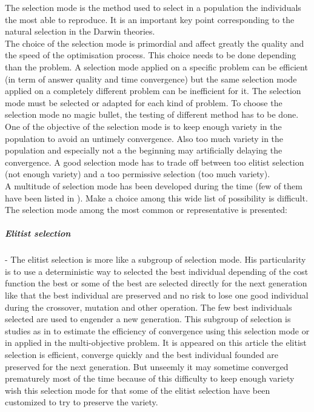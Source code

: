  The selection mode is  the method  used to select in a population the individuals the most able to reproduce. It is an important key point corresponding to the natural selection in the Darwin theories. \\
The choice of the selection mode is primordial and affect greatly the quality and the speed of the optimisation process. This choice needs to be done depending than the problem. A selection mode applied on a specific problem  can be efficient (in term of answer quality and time convergence)  but  the same  selection mode applied on  a completely different problem can be inefficient for it.  The selection mode must be selected or adapted for each kind of problem. To choose the selection mode no magic  bullet, the testing of different method has to be done.\\
One of the objective of the selection mode is to keep enough variety in the population to avoid an untimely  convergence. Also too much variety in the population and especially not a the beginning may artificially delaying the convergence. A good selection mode has to trade off between too elitist selection (not enough variety) and a too permissive selection (too much variety). \\
A multitude of selection mode has been developed during the time (few of them have been listed in \cite{123*owais2008}). Make a choice among this wide list of possibility is difficult. The selection mode among the most common  or representative is  presented:    \\

\subparagraph{Elitist selection}
-	The elitist selection is more like a subgroup of selection mode. His particularity is to use a deterministic way to selected the best individual depending of the cost function the best or some of the best are selected directly for the next generation like that the best individual are preserved and no risk  to lose one good individual during the crossover, mutation and other operation. The few best individuals selected are used to engender a new generation.
  This subgroup of selection is studies as in \cite{69*deb2000,64*matsui1999}  to estimate the efficiency of convergence using this selection mode or in \cite{140*soremekun2001} applied in the multi-objective problem. It is appeared on this article the elitist selection is efficient, converge quickly and the best individual founded are preserved  for the next generation. But unseemly it may sometime converged prematurely most of the time because of this difficulty to keep enough variety wish this selection mode for that some of the elitist selection have been customized to try to preserve the variety. \\
	
